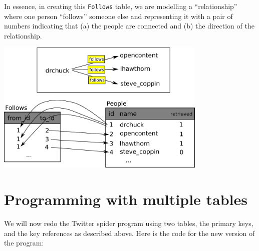 In essence, in creating this {\tt Follows} table, we are modelling a 
``relationship'' where one person ``follows'' someone else
and representing it with a pair of numbers indicating that (a) the people are
connected and (b) the direction of the relationship.

\beforefig
\centerline{\includegraphics[height=2.50in]{figs2/twitter.eps}}
\afterfig


\section{Programming with multiple tables}

We will now redo the Twitter spider program using two tables, the primary
keys, and the key references as described above.  Here is the code for 
the new version of the program:

